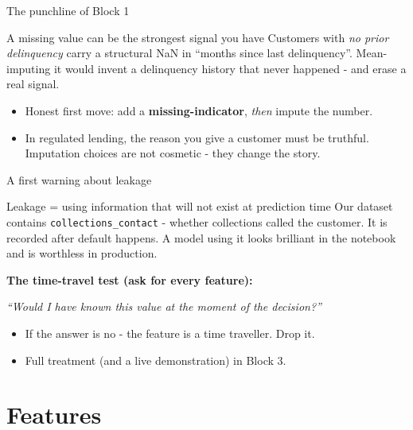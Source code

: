 \documentclass[10pt,aspectratio=169]{beamer}
\begin{document}
\begin{frame}{The punchline of Block 1}
  \begin{block}{A missing value can be the strongest signal you have}
    Customers with \emph{no prior delinquency} carry a structural NaN in
    ``months since last delinquency''. Mean-imputing it would \alert{invent a
    delinquency history that never happened} - and erase a real signal.
  \end{block}
  \begin{itemize}\small
    \item Honest first move: add a \textbf{missing-indicator}, \emph{then} impute the number.
    \item In regulated lending, the reason you give a customer must be truthful.
          Imputation choices are not cosmetic - they change the story.
  \end{itemize}
\end{frame}

\begin{frame}{A first warning about leakage}
  \begin{block}{Leakage = using information that will not exist at prediction time}
    Our dataset contains \texttt{collections\_contact} - whether collections
    called the customer. It is \alert{recorded after default happens}. A model
    using it looks brilliant in the notebook and is worthless in production.
  \end{block}
  \vspace{0.4em}
  \textbf{The time-travel test (ask for every feature):}
  \begin{center}
    \emph{``Would I have known this value at the moment of the decision?''}
  \end{center}
  \vspace{0.4em}
  \begin{itemize}\small
    \item If the answer is no - the feature is a time traveller. Drop it.
    \item Full treatment (and a live demonstration) in Block 3.
  \end{itemize}
\end{frame}

\section{Features}
\end{document}

